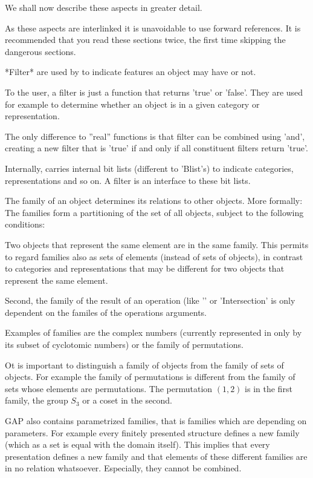 We shall now describe these aspects in greater detail.

As these aspects are interlinked it is unavoidable to use forward references.
It is recommended that you read these sections twice, the first time
skipping the dangerous sections.


*Filter* are used by {\GAP} to indicate features an object may have or not.

To the user, a filter is just a function that returns 'true' or 'false'.
They are used for example to determine whether an object is in a given
category or representation.

The only difference to ''real'' functions is that filter can be combined
using 'and', creating a new filter that is 'true' if and only if all
constituent filters return 'true'. 

\danger
Internally, {\GAP} carries internal bit lists (different to 'Blist's) to
indicate categories, representations and so on. A filter is an interface to
these bit lists.


The family of an object determines its relations to other objects. More
formally: The families form a partitioning of the set of all objects, subject
to the following conditions:

Two objects that represent the same element are in the same family. This
permits to regard families also as sets of elements (instead of sets of
objects), in contrast to categories and representations that may be
different for two objects that represent the same element.

Second, the family of the result of an operation (like '\*' or 'Intersection'
is only dependent on the familes of the operations arguments.

Examples of families are the complex numbers (currently represented in
{\GAP}
only by its subset of cyclotomic numbers) or the family of permutations.

Ot is important to distinguish a family of objects from the family of sets
of objects. For example the family of permutations is different from the
family of sets whose elements are permutations. The permutation $(1,2)$ is
in the first family, the group $S_3$ or a coset in the second.

\danger
GAP also contains parametrized families, that is families which are
depending on parameters. For example every finitely presented structure
defines a new family (which as a set is equal with the domain itself).
This implies that every presentation defines a new family and that elements
of these different families are in no relation whatsoever. Especially,
they cannot be combined.

